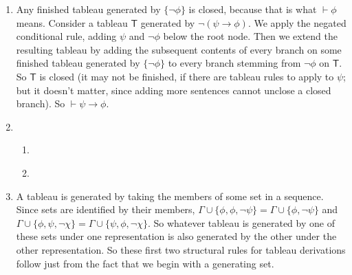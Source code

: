 {\begin{enumerate}
\item Any finished tableau generated by $\{\neg\phi\}$ is closed, because that is what $\vdash\phi$ means. Consider a tableau $\mathsf{T}$ generated by $\neg(\psi\to\phi)$. We apply the negated conditional rule, adding $\psi$ and $\neg\phi$ below the root node. Then we extend the resulting tableau by adding the subsequent contents of every branch on some finished tableau generated by $\{\neg\phi\}$ to every branch stemming from $¬\phi$ on $\mathsf{T}$. So $\mathsf{T}$ is closed (it may not be finished, if there are tableau rules to apply to $\psi$; but it doesn't matter, since adding more sentences cannot unclose a closed branch). So $\vdash\psi\to\phi$.
\item \begin{enumerate}
	\item ~
	 {  	\qobitree}
 \setcounter{enumii}{4}
	\item ~ {
	\qobitree}
\end{enumerate}
\item A tableau is generated by taking the members of some set in a sequence. Since sets are identified by their members, $\Gamma\cup\{\phi, \phi, ¬\psi\} = \Gamma\cup\{\phi,¬\psi\}$ and $\Gamma\cup\{\phi,\psi,¬\chi\}=\Gamma\cup\{\psi,\phi,¬\chi\}$. So whatever tableau is generated by one of these sets under one representation is also generated by the other under the other representation. So these first two structural rules for tableau derivations follow just from the fact that we begin with a generating set. 


\end{enumerate}}
